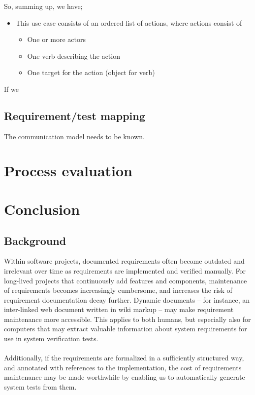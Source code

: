 \documentclass[10pt]{scrreprt}
\begin{document}
So, summing up, we have;
\begin{itemize}
  \item This use case consists of an ordered list of actions, where actions consist of
  \begin{itemize}
	\item One or more actors
	\item One verb describing the action
	\item One target for the action (object for verb)
  \end{itemize}
\end{itemize}
If we 

\section{Requirement/test mapping}
The communication model needs to be known.

\chapter{Process evaluation}

\chapter{Conclusion}




\section*{Background}
Within software projects, documented requirements often become outdated and irrelevant over time as requirements are implemented and verified manually. For long-lived projects that continuously add features and components, maintenance of requirements becomes increasingly cumbersome, and increases the risk of requirement documentation decay further. Dynamic documents -- for instance, an inter-linked web document written in wiki markup -- may make requirement maintenance more accessible. This applies to both humans, but especially also for computers that may extract valuable information about system requirements for use in system verification tests.\\\\
Additionally, if the requirements are formalized in a sufficiently structured way, and annotated with references to the implementation, the cost of requirements maintenance may be made worthwhile by enabling us to automatically generate system tests from them.
\end{document}
